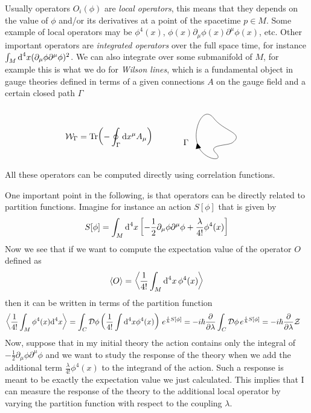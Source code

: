 \documentclass[../main/main.tex]{subfiles}
\begin{document}
Usually operators $O_i(\phi)$ are \emph{local operators}, this means that they depends on the value of $\phi$ and/or its derivatives at a point of the spacetime $p\in M$. Some example of local operators may be $\phi^4(x)$, $\phi(x)\partial_\mu\phi(x)\partial^\mu\phi(x)$, etc. Other important operators are \emph{integrated operators} over the full space time, for instance $\int_M\textup{d}^4x(\partial_\mu\phi\partial^\mu\phi)^2$. We can also integrate over some submanifold of $M$, for example this is what we do for \emph{Wilson lines}, which is a fundamental object in gauge theories defined in terms of a given connections $A$ on the gauge field and a certain closed path $\Gamma$
\vspace{-0.5cm}
\[\mathcal W_\Gamma=\Tr(-\oint_\Gamma\de x^\mu A_\mu)
\qquad\quad
\raisebox{-1cm}{
\begin{tikzpicture}[x=0.75pt,y=0.75pt,yscale=-1,xscale=1]
\draw    (239.3,173.79) .. controls (232.75,151.54) and (249.05,112.33) .. (265.88,134.64) .. controls (282.38,155.95) and (316.29,158.19) .. (294.59,173.84) .. controls (285.8,178.31) and (255.18,176.47) .. (269.03,189.74) .. controls (284.07,205.31) and (248.5,201.19) .. (240.1,176.56) ;
\draw [shift={(239.3,173.79)}, rotate = 436.39] [fill={rgb, 255:red, 0; green, 0; blue, 0 }  ][line width=0.08]  [draw opacity=0] (8.93,-4.29) -- (0,0) -- (8.93,4.29) -- cycle    ;
\draw (221.56,172.66) node    {$\Gamma $};
\end{tikzpicture}
}\]
All these operators can be computed directly using correlation functions. 

One important point in the following, is that operators can be directly related to partition functions. Imagine for instance an action $S[\phi]$ that is given by
\[S[\phi]=\int_M\textup{d}^4x\left[-\frac12\partial_\mu\phi\partial^\mu\phi+\frac\lambda{4!}\phi^4(x)\right]\]
Now we see that if we want to compute the expectation value of the operator $O$ defined as
\[\langle O\rangle=\left\langle\frac1{4!}\int_M\textup{d}^4x\,\phi^4(x)\right\rangle\]
then it can be written in terms of the partition function
\begin{align*}
\left\langle\frac1{4!}\int_M\phi^4(x)\textup{d}^4x\right\rangle
&=\int_C\mathcal D\phi\left(\frac{1}{4!}\int\textup{d}^4x\phi^4(x)\right)\,e^{\frac i\hbar S[\phi]}
=-i\hbar\frac{\partial}{\partial\lambda}\int_C\mathcal D\phi \,e^{\frac i\hbar S[\phi]}
=-i\hbar\frac{\partial}{\partial\lambda}\mathcal Z
\end{align*}
Now, suppose that in my initial theory the action contains only the integral of $-\frac12\partial_\mu\phi\partial^\mu\phi$ and we want to study the response of the theory when we add the additional term $\frac\lambda{4!}\phi^4(x)$ to the integrand of the action. Such a response is meant to be exactly the expectation value we just calculated. 
This implies that I can measure the response of the theory to the additional local operator by varying the partition function with respect to the coupling $\lambda$. 
\end{document}
